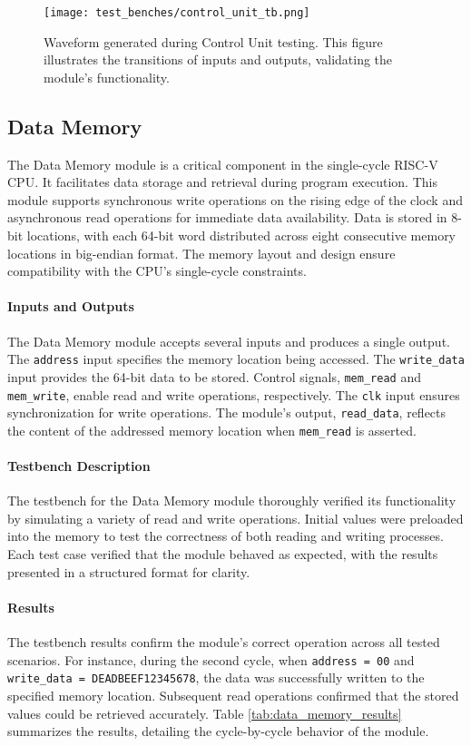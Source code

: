 \documentclass[12pt]{article}
\begin{document}
\begin{figure}[ht!]
    \centering
    \texttt{[image: test\_benches/control\_unit\_tb.png]}
    \caption{Waveform generated during Control Unit testing. This figure illustrates the transitions of inputs and outputs, validating the module's functionality.}
    \label{fig:control_unit_waveform}
\end{figure}

\subsection*{Data Memory}

The Data Memory module is a critical component in the single-cycle RISC-V CPU. It facilitates data storage and retrieval during program execution. This module supports synchronous write operations on the rising edge of the clock and asynchronous read operations for immediate data availability. Data is stored in 8-bit locations, with each 64-bit word distributed across eight consecutive memory locations in big-endian format. The memory layout and design ensure compatibility with the CPU's single-cycle constraints.

\paragraph{Inputs and Outputs}
The Data Memory module accepts several inputs and produces a single output. The \texttt{address} input specifies the memory location being accessed. The \texttt{write\_data} input provides the 64-bit data to be stored. Control signals, \texttt{mem\_read} and \texttt{mem\_write}, enable read and write operations, respectively. The \texttt{clk} input ensures synchronization for write operations. The module's output, \texttt{read\_data}, reflects the content of the addressed memory location when \texttt{mem\_read} is asserted.

\paragraph{Testbench Description}
The testbench for the Data Memory module thoroughly verified its functionality by simulating a variety of read and write operations. Initial values were preloaded into the memory to test the correctness of both reading and writing processes. Each test case verified that the module behaved as expected, with the results presented in a structured format for clarity.

\paragraph{Results}
The testbench results confirm the module's correct operation across all tested scenarios. For instance, during the second cycle, when \texttt{address = 00} and \texttt{write\_data = DEADBEEF12345678}, the data was successfully written to the specified memory location. Subsequent read operations confirmed that the stored values could be retrieved accurately. Table \ref{tab:data_memory_results} summarizes the results, detailing the cycle-by-cycle behavior of the module.
\end{document}
